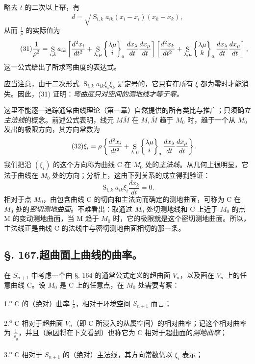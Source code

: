 略去 \(t\) 的二次以上幂，有
\[
 d=\sqrt{\mathop{\mathrm{S}}_{i,k}a_{ik}(x_i-\overline{x}_i)(x_k-\overline{x}_k)},
\]
从而 \(\frac1\rho\) 的实际值为
\[
\tag{31}
\frac1{\rho^2}=
\mathop{\mathrm{S}}_{i,k}a_{ik}
\left[
\frac{d^2x_i}{dt^2}+
\mathop{\mathrm{S}}_{\lambda,\mu}\left\{\begin{matrix}\lambda\mu\\i\end{matrix}\right\}_{a}
\frac{dx_\lambda}{dt}\frac{dx_\mu}{dt}
\right]
\left[
\frac{d^2x_k}{dt^2}+
\mathop{\mathrm{S}}_{\lambda,\mu}\left\{\begin{matrix}\lambda\mu\\k\end{matrix}\right\}_{a}
\frac{dx_\lambda}{dt}\frac{dx_\mu}{dt}
\right],
\]
这一公式给出了所求弯曲度的表达式。

应当注意，由于二次形式 \(\mathop{\mathrm{S}}_{i,k}a_{ik}\xi_i\xi_k\) 是定号的，它只有在所有 \(\xi\) 都为零时才能消失。因此，(31) 证明：\emph{弯曲度只对空间的测地线才等于零。}

这里不能逐一追踪通常曲线理论（第一章）自然提供的所有类比与推广；只须确立\emph{主法线}的概念。前述公式表明，线元 \(M\overline M\) 在 \(M,\overline M\) 趋于 \(M_0\) 时，趋于一个从 \(M_0\) 发出的极限方向，其方向常数为
\[
\tag{32}
 \xi_i=\rho\left\{\frac{d^2x_i}{dt^2}+
 \mathop{\mathrm{S}}_{\lambda,\mu}\left\{\begin{matrix}\lambda\mu\\i\end{matrix}\right\}_{a}
 \frac{dx_\lambda}{dt}\frac{dx_\mu}{dt}\right\}.
\]
我们把沿 \((\xi_i)\) 的这个方向称为曲线 C 在 \(M_0\) 处的\emph{主法线}。从几何上很明显，它法于曲线在 \(M_0\) 处的方向；分析上，这由下列关系的成立得到验证：
\[
 \mathop{\mathrm{S}}_{i,k}a_{ik}\xi_i\frac{dx_k}{dt}=0.
\]
相对于点 \(M_0\)，由包含曲线 C 的切向和主法向而确定的测地曲面，可称为 C 在 \(M_0\) 处的\emph{密切测地曲面}。不难看出：取通过 \(M_0\) 处切测地线和 C 上近于 \(M_0\) 的点 M 的变动测地曲面，当 M 趋于 \(M_0\) 时，它的极限就是这个密切测地曲面。所以，主法线正是曲线 C 的法线中与密切测地曲面相切的那一条。

\subsection*{\S. 167.\quad 超曲面上曲线的曲率。}

在 \(S_{n+1}\) 中考虑一个由 \S. 164 的通常公式定义的超曲面 \(V_n\)，以及画在 \(V_n\) 上的任意曲线 C。设 \(M_0\) 是 C 上的任意点，在 \(M_0\) 处需要考察：

1.\textsuperscript{o} C 的（绝对）曲率 \(\frac1\rho\)，相对于环境空间 \(S_{n+1}\) 而言；

2.\textsuperscript{o} C 相对于超曲面 \(V_n\)（即 C 所浸入的从属空间）的相对曲率；记这个相对曲率为 \(\frac1{\rho_g}\)，并且（原因将在下文看到）也称它为 C 相对于超曲面的\emph{测地曲率}；

3.\textsuperscript{o} C 相对于 \(S_{n+1}\) 的（绝对）主法线，其方向常数仍以 \(\xi_i\) 表示；

